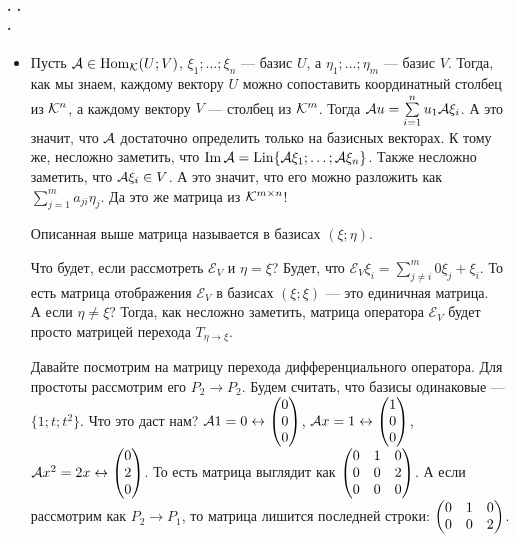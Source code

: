 \documentclass{article}
\DeclareMathOperator{\operIm}{Im}
\let\Im\operIm
\newcommand{\id}{{\mathcal{E}}}
\begin{document}
    \paragraph{. .\\.}
    \begin{itemize}
        \item[]
        \begin{Comment}
            Пусть ${\mathcal{A}}\in\operatorname{Hom}_{\mathcal{K}}(U;V)$, $\xi_1;\ldots;\xi_n$ --- базис $U$, а $\eta_1;\ldots;\eta_m$ --- базис $V$. Тогда, как мы знаем, каждому вектору $U$ можно сопоставить координатный столбец из ${\mathcal{K}}^n$, а каждому вектору $V$ --- столбец из ${\mathcal{K}}^m$. Тогда ${\mathcal{A}} u=\sum\limits_{i=1}^nu_1{\mathcal{A}}\xi_i$. А это значит, что ${\mathcal{A}}$ достаточно определить только на базисных векторах. К тому же, несложно заметить, что $\Im\scriptA=\Lin\{\scriptA\xi_1;\ldots;\scriptA\xi_n\}$. Также несложно заметить, что ${\mathcal{A}}\xi_i\in V$. А это значит, что его можно разложить как $\sum\limits_{j=1}^ma_{ji}\eta_j$. Да это же матрица из ${\mathcal{K}}^{m\times n}$!
        \end{Comment}
        \dfn Описанная выше матрица называется  в базисах $(\xi;\eta)$.
        \begin{Example}
            Что будет, если рассмотреть $\id_V$ и $\eta=\xi$? Будет, что $\id_V\xi_i=\sum\limits_{j\neq i}^m0\xi_j+\xi_i$. То есть матрица отображения $\id_V$ в базисах $(\xi;\xi)$ --- это единичная матрица.\\
            А если $\eta\neq\xi$? Тогда, как несложно заметить, матрица оператора $\id_V$ будет просто матрицей перехода $T_{\eta\to\xi}$.
        \end{Example}
        \begin{Example}
            Давайте посмотрим на матрицу перехода дифференциального оператора. Для простоты рассмотрим его $P_2\to P_2$. Будем считать, что базисы одинаковые --- $\{1;t;t^2\}$. Что это даст нам? ${\mathcal{A}}1=0\leftrightarrow\left(\begin{matrix}0\\0\\0\end{matrix}\right)$, ${\mathcal{A}} x=1\leftrightarrow\left(\begin{matrix}1\\0\\0\end{matrix}\right)$, ${\mathcal{A}} x^2=2x\leftrightarrow\left(\begin{matrix}0\\2\\0\end{matrix}\right)$. То есть матрица выглядит как $\left(\begin{matrix}0 & 1 & 0\\0 & 0 & 2\\0 & 0 & 0\end{matrix}\right)$. А если рассмотрим как $P_2\to P_1$, то матрица лишится последней строки: $\left(\begin{matrix}0 & 1 & 0\\0 & 0 & 2\end{matrix}\right)$.

\end{Example}
\end{itemize}
\end{document}
